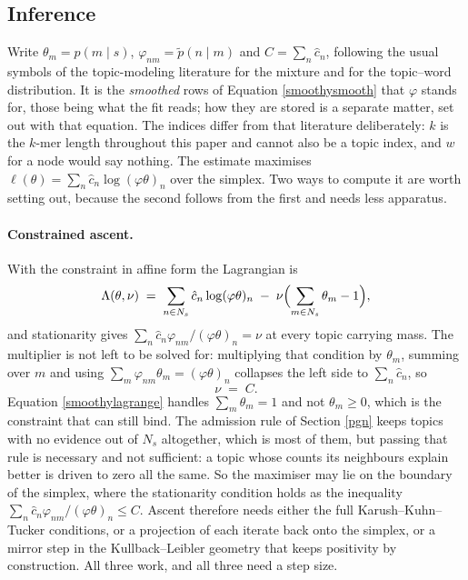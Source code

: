 \documentclass[pdflatex,sn-vancouver-num]{sn-jnl}
\begin{document}
    \subsection{Inference}\label{inference}
    Write $\theta_m = p(m \mid s)$, $\varphi_{nm} = \tilde{p}(n \mid m)$ and $C = \sum_n \hat{c}_n$,
    following the usual symbols of the topic-modeling literature for the mixture and for the
    topic--word distribution. It is the \emph{smoothed} rows of Equation \eqref{smoothysmooth} that
    $\varphi$ stands for, those being what the fit reads; how they are stored is a separate matter,
    set out with that equation. The indices differ from that literature deliberately: $k$ is the $k$-mer length
    throughout this paper and cannot also be a topic index, and $w$ for a node would say nothing. The estimate
    maximises $\ell(\theta) = \sum_n \hat{c}_n \log (\varphi\theta)_n$ over the simplex. Two ways to
    compute it are worth setting out, because the second follows from the first and needs less
    apparatus.

    \paragraph{Constrained ascent.} With the constraint in affine form the Lagrangian is
    \begin{equation}\label{smoothylagrange}
        \Lambda(\theta, \nu) \;=\; \sum_{n \in N_s} \hat{c}_n \log (\varphi\theta)_n
            \;-\; \nu \Bigl( \sum_{m \in N_s} \theta_m - 1 \Bigr),
    \end{equation}
    and stationarity gives $\sum_n \hat{c}_n \varphi_{nm} / (\varphi\theta)_n = \nu$ at every topic carrying
    mass. The multiplier is not left to be solved for: multiplying that condition by $\theta_m$,
    summing over $m$ and using $\sum_m \varphi_{nm} \theta_m = (\varphi\theta)_n$ collapses the left side to
    $\sum_n \hat{c}_n$, so
    \begin{equation}\label{smoothylambda}
        \nu \;=\; C .
    \end{equation}
    Equation \eqref{smoothylagrange} handles $\sum_m \theta_m = 1$ and not $\theta_m \geq 0$, which
    is the constraint that can still bind. The admission rule of Section \ref{pgn} keeps topics with
    no evidence out of $N_s$ altogether, which is most of them, but passing that rule is necessary and
    not sufficient: a topic whose counts its neighbours explain better is driven to zero all the same.
    So the maximiser may lie on the boundary of the simplex, where the stationarity condition holds as
    the inequality
    $\sum_n \hat{c}_n \varphi_{nm} / (\varphi\theta)_n \leq C$. Ascent therefore needs either the full
    Karush--Kuhn--Tucker conditions, or a projection of each iterate back onto the simplex, or a
    mirror step in the Kullback--Leibler geometry that keeps positivity by construction. All three
    work, and all three need a step size.
\end{document}
